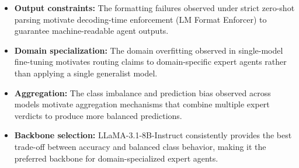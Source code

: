 \begin{itemize}
    \item \textbf{Output constraints:} The formatting failures observed 
    under strict zero-shot parsing motivate decoding-time enforcement 
    (LM Format Enforcer) to guarantee machine-readable agent outputs.
    
    \item \textbf{Domain specialization:} The domain overfitting observed in single-model fine-tuning motivates routing claims to 
    domain-specific expert agents rather than applying a single generalist model.
    
    \item \textbf{Aggregation:} The class imbalance and prediction bias observed across models motivate aggregation mechanisms that combine multiple expert verdicts to produce more balanced predictions.
    
    \item \textbf{Backbone selection:} LLaMA-3.1-8B-Instruct consistently provides the best trade-off between accuracy and balanced class behavior, making it the preferred backbone for domain-specialized expert agents.
\end{itemize}


